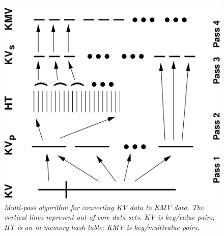 \begin{figure}
\includegraphics[width=\textwidth,angle=-90]{fig_collate2.pdf}
\caption{\it Multi-pass algorithm for converting KV data to KMV data.
The vertical lines represent out-of-core data sets.  KV is key/value
pairs; HT is an in-memory hash table; KMV is key/multivalue pairs.}
\label{fig:collate}
\end{figure}

